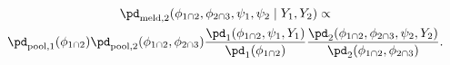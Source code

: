 \begin{multline}
  \pd_{\text{meld}, 2} (\phi_{1 \cap 2}, \phi_{2 \cap 3}, \psi_{1}, \psi_{2} \mid Y_{1}, Y_{2}) \propto \\
  \pd_{\text{pool}, 1}(\phi_{1 \cap 2})
  \pd_{\text{pool}, 2}(\phi_{1 \cap 2}, \phi_{2 \cap 3})
  \frac {
    \pd_{1}(\phi_{1 \cap 2}, \psi_{1}, Y_{1})
  } {
    \pd_{1}(\phi_{1 \cap 2})
  }
  \frac {
    \pd_{2} (\phi_{1 \cap 2}, \phi_{2 \cap 3}, \psi_{2}, Y_{2})
  } {
    \pd_{2}(\phi_{1 \cap 2}, \phi_{2 \cap 3})
  }.
  \label{eqn:stage-two-target}
\end{multline}